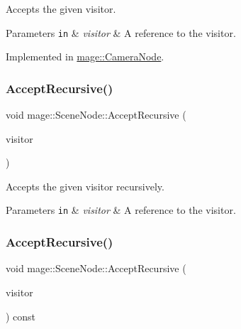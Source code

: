 Accepts the given visitor.


\begin{DoxyParams}[1]{Parameters}
\mbox{\tt in}  & {\em visitor} & A reference to the visitor. \\
\hline
\end{DoxyParams}


Implemented in \hyperlink{classmage_1_1_camera_node_a8b94f57b3a04f70b2c04a3d7c1ba3082}{mage\+::\+Camera\+Node}.

\hypertarget{classmage_1_1_scene_node_a87f53bc4edcbfcd9cf7c2390c4a99ae4}{}\label{classmage_1_1_scene_node_a87f53bc4edcbfcd9cf7c2390c4a99ae4} 
\subsubsection{\texorpdfstring{Accept\+Recursive()}{AcceptRecursive()}\hspace{0.1cm}{\footnotesize\ttfamily [1/2]}}
{\footnotesize\ttfamily void mage\+::\+Scene\+Node\+::\+Accept\+Recursive (\begin{DoxyParamCaption}\item[{\hyperlink{classmage_1_1_scene_node_visitor}{Scene\+Node\+Visitor} \&}]{visitor }\end{DoxyParamCaption})}

Accepts the given visitor recursively.


\begin{DoxyParams}[1]{Parameters}
\mbox{\tt in}  & {\em visitor} & A reference to the visitor. \\
\hline
\end{DoxyParams}
\hypertarget{classmage_1_1_scene_node_a3463a687f049dac387500a6ace5f62e7}{}\label{classmage_1_1_scene_node_a3463a687f049dac387500a6ace5f62e7} 
\subsubsection{\texorpdfstring{Accept\+Recursive()}{AcceptRecursive()}\hspace{0.1cm}{\footnotesize\ttfamily [2/2]}}
{\footnotesize\ttfamily void mage\+::\+Scene\+Node\+::\+Accept\+Recursive (\begin{DoxyParamCaption}\item[{\hyperlink{classmage_1_1_scene_node_visitor}{Scene\+Node\+Visitor} \&}]{visitor }\end{DoxyParamCaption}) const}

